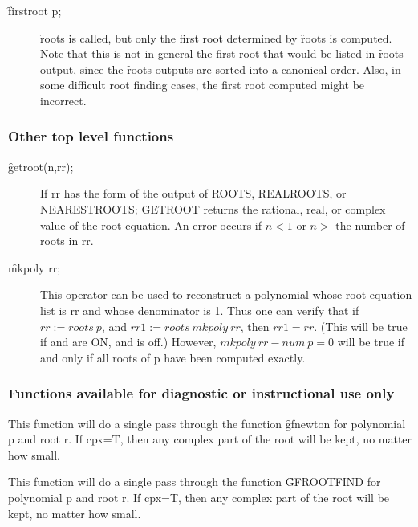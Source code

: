 \begin{description}
\item[\f{firstroot} p;]
  \hypertarget{operator:FIRSTROOT}{}
\f{roots} is called, but only the first root determined by
\f{roots} is computed.  Note that this is not in general the first root that
would be listed in \f{roots} output, since the \f{roots} outputs are sorted into
a canonical order.  Also, in some difficult root finding cases, the first
root computed might be incorrect.
\end{description}


\subsubsection{Other top level functions}

\begin{description}
\item[\f{getroot}(n,rr);]
     
\hypertarget{operator:GETROOT}{}
If rr has the form of the output of ROOTS, REALROOTS,
or NEARESTROOTS; \f{GETROOT} returns the rational, real, or complex value of
the root equation.  An error occurs if $n<1$ or $n>$ the number of roots in
rr.

\item[\f{mkpoly} rr;]
  \hypertarget{operator:MKPOLY}{}
This operator can be used to reconstruct a polynomial
whose root equation list is rr and whose denominator is 1.  Thus one can
verify that if $rr := roots~p$, and $rr1 := roots~mkpoly~rr$, then
$rr1 = rr$. (This will be true if  and  are ON,
and  is off.)
However, $mkpoly~rr - num~p = 0$ will be true if and only if all roots of p
have been computed exactly.
\end{description}

\subsubsection{Functions available for diagnostic or instructional use only}
\hypertarget{operator:GFNEWT}{}
\hypertarget{operator:GFROOT}{}
\begin{description}
\item[\f{gfnewt}(p,r,cpx);] This function will do a single pass through the
function \f{gfnewton} for polynomial p and root r.  If cpx=T, then any
complex part of the root will be kept, no matter how small.

\item[\f{gfroot}(p,r,cpx);] This function will do a single pass through the
function \f{GFROOTFIND} for polynomial p and root r.  If cpx=T, then any
complex part of the root will be kept, no matter how small.
\end{description}

